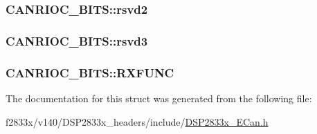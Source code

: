 \subsubsection[{rsvd2}]{ C\+A\+N\+R\+I\+O\+C\+\_\+\+B\+I\+T\+S\+::rsvd2}\label{struct_c_a_n_r_i_o_c___b_i_t_s_adc051bd0f47f7c09a2a1a966a7387872}
\hypertarget{struct_c_a_n_r_i_o_c___b_i_t_s_a47ebdb84cefdc21bdee08f9d756d2928}{}
\subsubsection[{rsvd3}]{ C\+A\+N\+R\+I\+O\+C\+\_\+\+B\+I\+T\+S\+::rsvd3}\label{struct_c_a_n_r_i_o_c___b_i_t_s_a47ebdb84cefdc21bdee08f9d756d2928}
\hypertarget{struct_c_a_n_r_i_o_c___b_i_t_s_acf85eaefdca5534644c2e522f1165380}{}
\subsubsection[{R\+X\+F\+U\+N\+C}]{ C\+A\+N\+R\+I\+O\+C\+\_\+\+B\+I\+T\+S\+::\+R\+X\+F\+U\+N\+C}\label{struct_c_a_n_r_i_o_c___b_i_t_s_acf85eaefdca5534644c2e522f1165380}


The documentation for this struct was generated from the following file\+:\begin{DoxyCompactItemize}
\item 
f2833x/v140/\+D\+S\+P2833x\+\_\+headers/include/\hyperlink{_d_s_p2833x___e_can_8h}{D\+S\+P2833x\+\_\+\+E\+Can.\+h}\end{DoxyCompactItemize}

